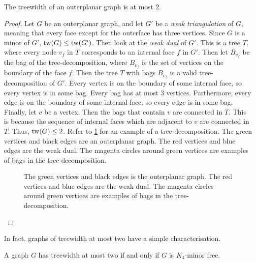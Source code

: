 \begin{proposition}\label{ex:tw_outerplanar}
	The treewidth of an outerplanar graph is at most 2.
\end{proposition}
\begin{proof}
	Let \(G\) be an outerplanar graph, and let \(G'\) be a \textit{weak triangulation} of \(G\), meaning that every face except for the outerface has three vertices. Since \(G\) is a minor of \(G'\), \(\operatorname{tw}(G) \leq \operatorname{tw}(G')\). Then look at the \textit{weak dual} of \(G'\). This is a tree \(T\), where every node \(v_f\) in \(T\) corresponds to an internal face \(f\) in \(G'\). Then let \(B_{v_f}\) be the bag of the tree-decomposition, where \(B_{v_f}\) is the set of vertices on the boundary of the face \(f\). Then the tree \(T\) with bags \(B_{v_f}\) is a valid tree-decomposition of \(G'\). Every vertex is on the boundary of some internal face, so every vertex is in some bag. Every bag has at most 3 vertices. Furthermore, every edge is on the boundary of some internal face, so every edge is in some bag. Finally, let $v$ be a vertex. Then the bags that contain $v$ are connected in $T$. This is because the sequence of internal faces which are adjacent to $v$ are connected in $T$. Thus, \(\operatorname{tw}(G) \leq 2\). Refer to \cref{fig:outerplanar_treedecomp} for an example of a tree-decomposition. The green vertices and black edges are an outerplanar graph. The red vertices and blue edges are the weak dual. The magenta circles around green vertices are examples of bags in the tree-decomposition.
	\begin{figure}[h!]
		\centering
		
		\caption[Tree-decomposition of outerplanar graph.]{The green vertices and black edges is the outerplanar graph. The red vertices and blue edges are the weak dual. The magenta circles around green vertices are examples of bags in the tree-decomposition.}\label{fig:outerplanar_treedecomp}
	\end{figure}
\end{proof}

In fact, graphs of treewidth at most two have a simple characterisation.

\begin{proposition}\label{prop:k4-minor}
	A graph $G$ has treewidth at most two if and only if $G$ is $K_4$-minor free. 
\end{proposition}

